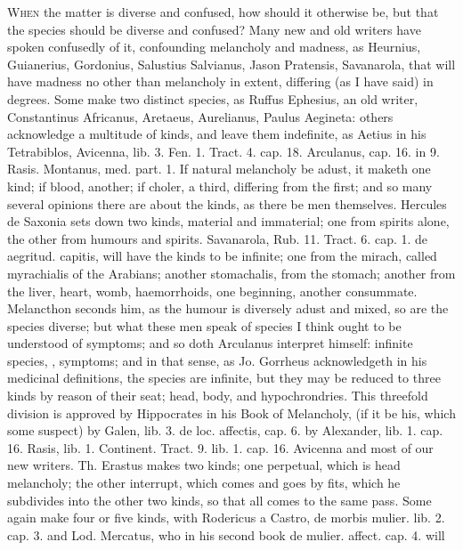 {{\lettrine{W}{hen} the matter is diverse and confused, how should it otherwise be, but
that the species should be diverse and confused? Many new and old
writers have spoken confusedly of it, confounding melancholy and
madness, as Heurnius, Guianerius, Gordonius, Salustius
Salvianus, Jason Pratensis, Savanarola, that will have madness no other
than melancholy in extent, differing (as I have said) in degrees. Some
make two distinct species, as Ruffus Ephesius, an old writer,
Constantinus Africanus, Aretaeus, Aurelianus, Paulus
Aegineta: others acknowledge a multitude of kinds, and leave them
indefinite, as Aetius in his Tetrabiblos, Avicenna, lib. 3. Fen.
1. Tract. 4. cap. 18. Arculanus, cap. 16. in 9. Rasis. Montanus, med.
part. 1. If natural melancholy be adust, it maketh one kind; if
blood, another; if choler, a third, differing from the first; and so
many several opinions there are about the kinds, as there be men
themselves. Hercules de Saxonia sets down two kinds, material and
immaterial; one from spirits alone, the other from humours and spirits.
Savanarola, Rub. 11. Tract. 6. cap. 1. de aegritud. capitis, will have
the kinds to be infinite; one from the mirach, called myrachialis of
the Arabians; another stomachalis, from the stomach; another from the
liver, heart, womb, haemorrhoids, one beginning, another
consummate. Melancthon seconds him, as the humour is diversely
adust and mixed, so are the species diverse; but what these men speak of
species I think ought to be understood of symptoms; and so doth 
Arculanus interpret himself: infinite species, \ie{}, symptoms; and in
that sense, as Jo. Gorrheus acknowledgeth in his medicinal definitions,
the species are infinite, but they may be reduced to three kinds by
reason of their seat; head, body, and hypochrondries. This threefold
division is approved by Hippocrates in his Book of Melancholy, (if it
be his, which some suspect) by Galen, lib. 3. de loc. affectis, cap. 6.
by Alexander, lib. 1. cap. 16. Rasis, lib. 1. Continent. Tract. 9. lib.
1. cap. 16. Avicenna and most of our new writers. Th. Erastus makes two
kinds; one perpetual, which is head melancholy; the other interrupt,
which comes and goes by fits, which he subdivides into the other two
kinds, so that all comes to the same pass. Some again make four or five
kinds, with Rodericus a Castro, de morbis mulier. lib. 2. cap. 3. and
Lod. Mercatus, who in his second book de mulier. affect. cap. 4. will
}}
